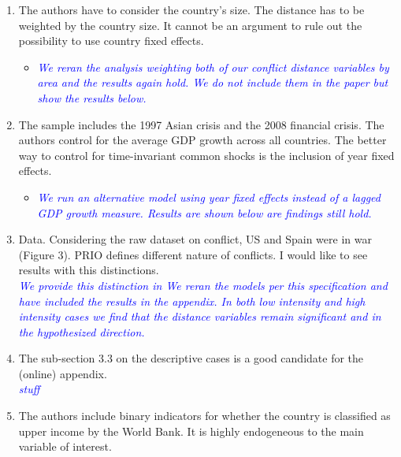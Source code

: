 \begin{enumerate}
\newpage
\item The authors have to consider the country’s size. The distance has to be weighted by the country size. It cannot be an argument to rule out the possibility to use country fixed effects. \\

\begin{itemize}
\item \textcolor{blue}{\emph{
	We reran the analysis weighting both of our conflict distance variables by area and the results again hold. We do not include them in the paper but show the results below. 
}}

\end{itemize}

\item The sample includes the 1997 Asian crisis and the 2008 financial crisis. The authors control for the average GDP growth across all countries. The better way to control for time-invariant common shocks is the inclusion of year fixed effects. \\

\begin{itemize}
\item \textcolor{blue}{\emph{
	We run an alternative model using year fixed effects instead of a lagged GDP growth measure. Results are shown below are findings still hold.
}}

\end{itemize}

\item Data. Considering the raw dataset on conflict, US and Spain were in war (Figure 3). PRIO defines different nature of conflicts. I would like to see results with this distinctions. \\

\textcolor{blue}{\emph{
	We provide this distinction in 
	We reran the models per this specification and have included the results in the appendix. In both low intensity and high intensity cases we find that the distance variables remain significant and in the hypothesized direction.
}}

\item The sub-section 3.3 on the descriptive cases is a good candidate for the (online) appendix. \\

\textcolor{blue}{\emph{
	stuff
}}

\item  The authors include binary indicators for whether the country is classified as upper income by the World Bank. It is highly endogeneous to the main variable of interest. \\


\end{enumerate}
